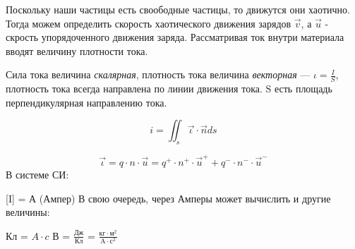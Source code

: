 \documentclass[../main.tex]{subfiles}
\begin{document}
Поскольку наши частицы есть своободные частицы, то движутся они хаотично. Тогда можем определить скорость хаотического движения зарядов $\vec v$,
а $\vec u$ - скрость упорядоченного движения заряда. Рассматривая ток внутри материала вводят величину плотности тока.

Сила тока величина \textit{скалярная}, плотность тока величина \textit{векторная} --- $\iota = \frac{I}{S}$,
 плотность тока всегда направлена по линии движения тока. S есть площадь перпендикулярная направлению тока.

\[i = \iint_{s} \vec \iota \cdot \vec n ds\]

\[\vec \iota = q \cdot n \cdot \vec u = q^{+} \cdot n^{+} \cdot \vec u^{+} + q^{-} \cdot n^{-} \cdot \vec u^{-}\]
В системе СИ:

[I] = А (Ампер)
В свою очередь, через Амперы может вычислить и другие величины:
\begin{center}
    Кл = $A \cdot c$
    В = $\frac{\text{Дж}}{\text{Кл}}$ = $\frac{\text{кг} \cdot \text{м}^2}{\text{A} \cdot \text{с}^2}$
\end{center}
\end{document}
